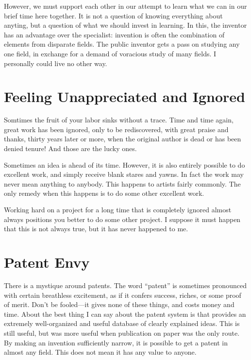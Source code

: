 \documentclass[
	fontsize=10pt, %
	twoside=false, %
	secnumdepth=1, %
]{kaobook}
\begin{document}
However, we must support each other in our attempt to learn what we can
in our brief time here together. It is not a question of knowing everything
about anyting, but a question of what we should invest in learning.
In this, the inventor has an advantage over the specialist:
invention is often the combination of elements from disparate fields.
The public inventor gets a pass on studying any one field,
in exchange for a demand of voracious study of many fields.
I personally could live no other way.

\section{Feeling Unappreciated and Ignored}

Somtimes the fruit of your labor sinks without a trace.
Time and time again, great work has been ignored, only to be
rediscovered, with great praise and thanks, thirty years later or more,
when the original author is dead or has been denied tenure!
And those are the lucky ones.

Sometimes an idea is ahead of its time.
However, it is also entirely possible to do excellent work, and simply
receive blank stares and yawns.
In fact the work may never
mean anything to anybody.
This happens to artists fairly commonly.
The only remedy when this happens is to do some other excellent work.

Working hard on a project for a long time that is completely ignored
almost always positions you better to do some other project.
I suppose it must happen that this is not always true,
but it has never happened to me.

\section{Patent Envy}
\label{sec:patentenvy}

There is a mystique around patents.
The word ``patent'' is sometimes pronounced with certain
breathless excitement, as if it confers success, riches,
or some proof of merit.
Don't be fooled---it gives none of these things,
and costs money and time.
About the best thing I can say about the patent system
is that provides an extremely well-organized and useful
database of clearly explained ideas.
This is still useful, but was more useful
when publication on paper was the only route.
By making an invention sufficiently narrow, it
is possible to get a patent in almost any field.
This does not mean it has any value to anyone.
\end{document}
